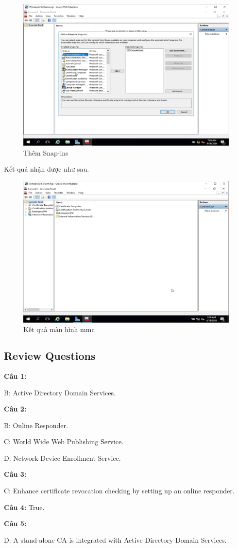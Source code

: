 \begin{figure}[!htb]
    \centering
    \includegraphics[width=0.9\linewidth]{figure//chapter4//lab4_1/add_snap_in.png}
    \caption{Thêm Snap-ins}
    \label{fig:enter-label}
\end{figure}

\noindent Kết quả nhận được như sau.

\begin{figure}[!htb]
    \centering
    \includegraphics[width=0.9\linewidth]{figure//chapter4//lab4_1/result.png}
    \caption{Kết quả màn hình mmc}
    \label{fig:enter-label}
\end{figure}

\subsection{Review Questions}

\noindent \textbf{Câu 1:} 

B: Active Directory Domain Services.

\noindent \textbf{Câu 2:} 

B: Online Responder.

C: World Wide Web Publishing Service.

D: Network Device Enrollment Service.

\noindent \textbf{Câu 3:} 

C: Enhance certificate revocation checking by setting up an online responder.

\noindent \textbf{Câu 4:} True.

\noindent \textbf{Câu 5:} 


D: A stand-alone CA is integrated with Active Directory Domain Services.